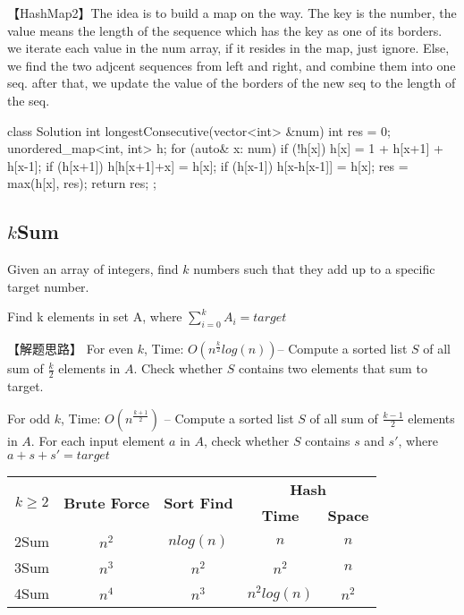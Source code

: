 【HashMap2】The idea is to build a map on the way. The key is the number, the value means the length of the sequence which has the key as one of its borders.
we iterate each value in the num array, if it resides in the map, just ignore. Else, we find the two adjcent sequences from left and right, and combine them into one seq. after that, we update the value of the borders of the new seq to the length of the seq.
\begin{Code}
    class Solution {
        int longestConsecutive(vector<int> &num) {
            int res = 0;
            unordered_map<int, int> h;
            for (auto& x: num) {
                if (!h[x]) {
                    h[x] = 1 + h[x+1] + h[x-1];
                    if (h[x+1]) h[h[x+1]+x] = h[x];
                    if (h[x-1]) h[x-h[x-1]] = h[x];
                }
                res = max(h[x], res);
            }
            return res;
        }
    };
\end{Code}

\subsection{$k$Sum} %
\label{sec:ksum}

Given an array of integers, find $k$ numbers such that they add up to a
specific target number.

Find k elements in set A, where $\sum_{i=0}^k{A_i}=target$


【解题思路】
For even $k$, Time: $O(n^{\frac{k}{2}}log(n))$--
Compute a sorted list $S$ of all sum of $\frac{k}{2}$ elements in $A$. Check whether $S$ contains two elements that sum to target.

For odd $k$, Time: $O(n^{\frac{k+1}{2}})$ --
Compute a sorted list $S$ of all sum of $\frac{k-1}{2}$ elements in $A$. For each input element $a$ in $A$, check whether $S$ contains $s$ and $s′$, where $a+s+s′=target$

\begin{center}
	\begin{tabular}{|c|c|c|c|c|}
		\hline
		\multirow{2}{*}{\textbf{$k≥2$}} & \multirow{2}{*}{\textbf{Brute Force}} & \multirow{2}{*}{\textbf{Sort Find}} & \multicolumn{2}{|c|}{\textbf{Hash}} \\
		\cline{4-5} & & & \textbf{Time} & \textbf{Space}\\
		\hline
		2Sum & $n^2$ & $nlog(n)$ & $n$ & $n$ \\
		\hline
		3Sum & $n^3$ & $n^2$ & $n^2$ & $n$ \\
		\hline
		4Sum & $n^4$ & $n^3$ & $n^2log(n)$ & $n^2$ \\
		\hline
	\end{tabular}
\end{center}



